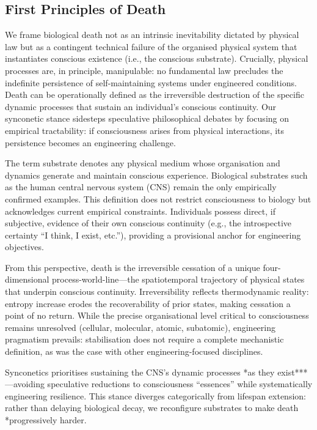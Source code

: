 \documentclass[10pt]{article}
\begin{document}
\begin{sloppypar}
  \subsection{First Principles of Death}
  \label{sec:first-principles}

  We frame biological death not as an intrinsic inevitability dictated by physical law but as a contingent technical failure of the organised physical system that instantiates conscious existence (i.e., the conscious substrate). Crucially, physical processes are, in principle, manipulable: no fundamental law precludes the indefinite persistence of self-maintaining systems under engineered conditions. Death can be operationally defined as the irreversible destruction of the specific dynamic processes that sustain an individual’s conscious continuity. Our synconetic stance sidesteps speculative philosophical debates by focusing on empirical tractability: if consciousness arises from physical interactions, its persistence becomes an engineering challenge.

  The term substrate denotes any physical medium whose organisation and dynamics generate and maintain conscious experience. Biological substrates such as the human central nervous system (CNS) remain the only empirically confirmed examples. This definition does not restrict consciousness to biology but acknowledges current empirical constraints. Individuals possess direct, if subjective, evidence of their own conscious continuity (e.g., the introspective certainty “I think, I exist, etc.”), providing a provisional anchor for engineering objectives.

  From this perspective, death is the irreversible cessation of a unique four-dimensional process-world-line—the spatiotemporal trajectory of physical states that underpin conscious continuity. Irreversibility reflects thermodynamic reality: entropy increase erodes the recoverability of prior states, making cessation a point of no return. While the precise organisational level critical to consciousness remains unresolved (cellular, molecular, atomic, subatomic), engineering pragmatism prevails: stabilisation does not require a complete mechanistic definition, as was the case with other engineering-focused disciplines.

  Synconetics prioritises sustaining the CNS’s dynamic processes *as they exist***—avoiding speculative reductions to consciousness “essences” while systematically engineering resilience. This stance diverges categorically from lifespan extension: rather than delaying biological decay, we reconfigure substrates to make death *progressively harder.


\end{sloppypar}
\end{document}
